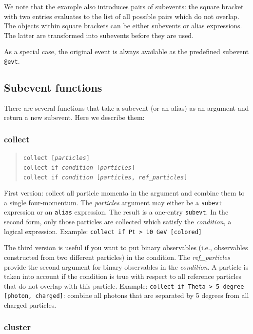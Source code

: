 \documentclass[12pt]{book}
\newcommand{\ttt}[1]{\texttt{#1}}
\begin{document}
We note that the example also introduces pairs of subevents: the square
bracket with two entries evaluates to the list of all possible pairs which do
not overlap.  The objects within square brackets can be either subevents or
alias expressions.  The latter are transformed into subevents before they are
used.

As a special case, the original event is always available as the predefined
subevent \verb|@evt|.

\subsection{Subevent functions}

There are several functions that take a subevent (or an alias) as an argument
and return a new subevent.  Here we describe them:

\subsubsection{collect}
\begin{quote}
\begin{footnotesize}
  \ttt{collect [\textit{particles}]} \\
  \ttt{collect if \textit{condition} [\textit{particles}]} \\
  \ttt{collect if \textit{condition} [\textit{particles}, \textit{ref\_particles}]}
\end{footnotesize}
\end{quote}
First version: collect all particle momenta in the argument and combine them
to a single four-momentum.  The \textit{particles} argument may either be a
\ttt{subevt} expression or an \ttt{alias} expression.  The result is a
one-entry \ttt{subevt}.  In the second form, only those particles are collected
which satisfy the \textit{condition}, a logical expression.  Example:
\ttt{collect if Pt > 10 GeV [colored]}

The third version is useful if you want to put binary observables (i.e.,
observables constructed from two different particles) in the condition.  The
\textit{ref\_particles} provide the second argument for binary observables in
the \textit{condition}.  A particle is taken into account if the condition is
true with respect to all reference particles that do not overlap with this
particle.  Example: \ttt{collect if Theta > 5 degree [photon, charged]}:
combine all photons that are separated by 5 degrees from all charged
particles.


\subsubsection{cluster}
\end{document}
